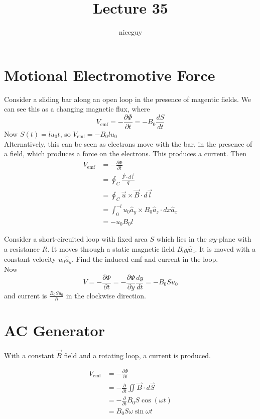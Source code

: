 \documentclass[12pt]{article}
\author{niceguy}
\title{Lecture 35}
\begin{document}
\maketitle

\section{Motional Electromotive Force}

Consider a sliding bar along an open loop in the presence of magentic fields. We can see this as a changing magnetic flux, where
$$V_{\text{emf}} = -\frac{\partial\Phi}{\partial t} = -B_0 \frac{dS}{dt}$$
Now $S(t) = lu_0t$, so $V_{\text{emf}} = -B_0lu_0$ \\
Alternatively, this can be seen as electrons move with the bar, in the presence of a field, which produces a force on the electrons. This produces a current. Then
\begin{align*}
    V_{\text{emf}} &= -\frac{\partial\Phi}{\partial t} \\
                   &= \oint_C \frac{\vec F \cdot d\vec l}{q} \\
                   &= \oint_C \vec u \times \vec B \cdot d\vec l \\
                   &= \int_0^{-l} u_0\hat a_y \times B_0 \hat a_z \cdot dx\hat a_x \\
                   &= -u_0B_0l
\end{align*}

\begin{ex}
    Consider a short-circuited loop with fixed area $S$ which lies in the $xy$-plane with a resistance $R$. It moves through a static magnetic field $B_0y\hat a_z$. It is moved with a constant velocity $u_0\hat a_y$. Find the induced emf and current in the loop. \\
    Now
    $$V = -\frac{\partial\Phi}{\partial t} = -\frac{\partial\Phi}{\partial y}\frac{dy}{dt} = -B_0Su_0$$
    and current is $\frac{B_0Su_0}{R}$ in the clockwise direction.
\end{ex}

\section{AC Generator}

With a constant $\vec B$ field and a rotating loop, a current is produced.

\begin{align*}
    V_{\text{emf}} &= -\frac{\partial \Phi}{\partial t} \\
                   &= -\frac{\partial}{\partial t} \iint \vec B \cdot d\vec S \\
                   &= -\frac{\partial}{\partial t}B_0S\cos(\omega t) \\
                   &= B_0S\omega\sin\omega t
\end{align*}
\end{document}
